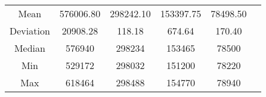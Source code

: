 \begin{table}[!ht]
{{\begin{tabular}{c|cc|cc|c}
                \multicolumn{1}{c|}{Mean}      & 576006.80                                           & 298242.10                               & 153397.75 & 78498.50  & \multicolumn{1}{l}{}                                                                                  \\ \cline{1-6}
                \multicolumn{1}{c|}{Deviation} & 20908.28                                            & 118.18                                  & 674.64    & 170.40    & \multicolumn{1}{l}{}                                                                                  \\ \cline{1-6}
                \multicolumn{1}{c|}{Median}    & 576940                                              & 298234                                  & 153465    & 78500     & \multicolumn{1}{l}{}                                                                                  \\ \cline{1-6}
                \multicolumn{1}{c|}{Min}       & 529172                                              & 298032                                  & 151200    & 78220     & \multicolumn{1}{l}{}                                                                                  \\ \cline{1-6}
                \multicolumn{1}{c|}{Max}       & 618464                                              & 298488                                  & 154770    & 78940     & \multicolumn{1}{l}{\parbox[t]{1em}{}} \\ \hline


\end{tabular}}}
\end{table}
